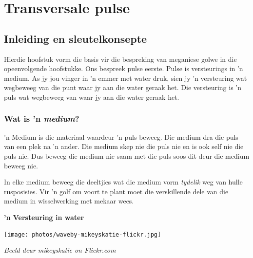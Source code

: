 \chapter{Transversale pulse}
         

\section{Inleiding en sleutelkonsepte}
    \nopagebreak
    \label{m38801*cid2}
Hierdie hoofstuk vorm die basis vir die bespreking van meganiese golwe in die opeenvolgende hoofstukke. Ons bespreek pulse eerste. Pulse is versteurings in 'n medium. As jy jou vinger in 'n emmer met water druk, sien jy 'n versteuring wat wegbeweeg van die punt waar jy aan die water geraak het. Die versteuring is 'n puls wat wegbeweeg van waar jy aan die water geraak het.
            

\subsection*{Wat is 'n \textsl{medium}?}
            \nopagebreak
\begin{minipage}{.5\textwidth}

 'n Medium is die materiaal waardeur 'n puls beweeg. Die medium dra die puls van een plek na 'n ander. Die medium skep nie die puls nie en is ook self nie die puls nie. Dus beweeg die medium nie saam met die puls soos dit deur die medium beweeg nie.

In elke medium beweeg die deeltjies wat die medium vorm \textit{tydelik} weg van hulle rusposisies. Vir 'n golf om voort te plant moet die verskillende dele van die medium in wisselwerking met mekaar wees.
\end{minipage}
\begin{minipage}{.5\textwidth}
\begin{center}
\textbf{ 'n Versteuring in water}\par
 \texttt{[image: photos/waveby-mikeyskatie-flickr.jpg]}\par
\textit{\small Beeld deur mikeyskatie on Flickr.com}
\end{center}
\end{minipage}


\label{m38801*fhsst!!!underscore!!!id51}


